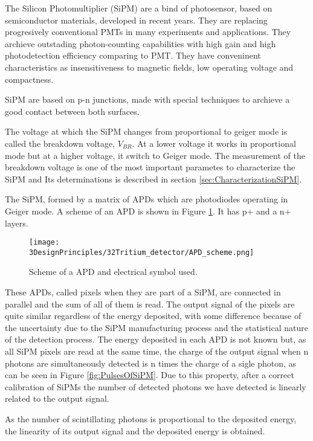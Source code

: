 The Silicon Photomultiplier (SiPM) are a bind of photosensor, based on semiconductor materials, developed in recent years. They are replacing progresively conventional PMTs in many experiments and applications. They archieve outstading photon-counting capabilities with high gain and high photodetection efficiency comparing to PMT. They have conveninent characteristics as insensitiveness to magnetic fields, low operating voltage and compactness.

SiPM are based on p-n junctions, made with special techniques to archieve a good contact between both surfaces.

The voltage at which the SiPM changes from proportional to geiger mode is called the breakdown voltage, $ V_ {BR} $. At a lower voltage it works in proportional mode but at a higher voltage, it switch to Geiger mode. The measurement of the breakdown voltage is one of the most important parametes to characterize the SiPM and Its determinations is described in section \ref{sec:CharacterizationSiPM}.

The SiPM, formed by a matrix of APDs which are photodiodes operating in Geiger mode. A scheme of an APD is shown in Figure \ref{fig:SchemeAPD}. It has p+ and a n+ layers. 

\begin{figure}[htbp]
\centering
\texttt{[image: 3DesignPrinciples/32Tritium\_detector/APD\_scheme.png]}
\caption{Scheme of a APD and electrical symbol used.\label{fig:SchemeAPD}~\cite{OSI}}
\end{figure}
 
These APDs, called pixels when they are part of a SiPM, are connected in parallel and the sum of all of them is read. The output signal of the pixels are quite similar regardless of the energy deposited, with some difference because of the uncertainty due to the SiPM manufacturing process and the statistical nature of the detection process. The energy deposited in each APD is not known but, as all SiPM pixels are read at the same time, the charge of the output signal when n photons are simultaneously detected is n times the charge of a sigle photon, as can be seen in Figure \ref{fig:PulsesOfSiPM}. Due to this property, after a correct calibration of SiPMs the number of detected photons we have detected is linearly related to the output signal. 

As the number of scintillating photons is proportional to the deposited energy, the linearity of its output signal and the deposited energy is obtained.

